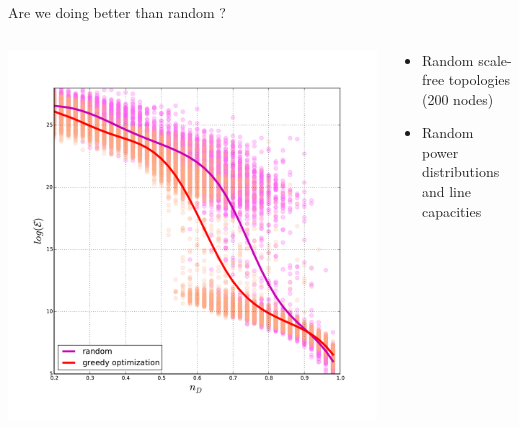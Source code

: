 \documentclass[xcolor=dvipsnames]{beamer}
\begin{document}
\begin{frame}
	\frametitle{}
	
	Are we doing better than random ?
	\begin{columns}
		\begin{column}{.6\textwidth}		
			\includegraphics[scale=.3]{figure_3}
		\end{column}
		\begin{column}{.4\textwidth}
			\begin{itemize}
				\item Random scale-free topologies (200 nodes)
				\item Random power distributions and line capacities
			\end{itemize}
		\end{column}
	\end{columns}
	
\end{frame}
\end{document}
